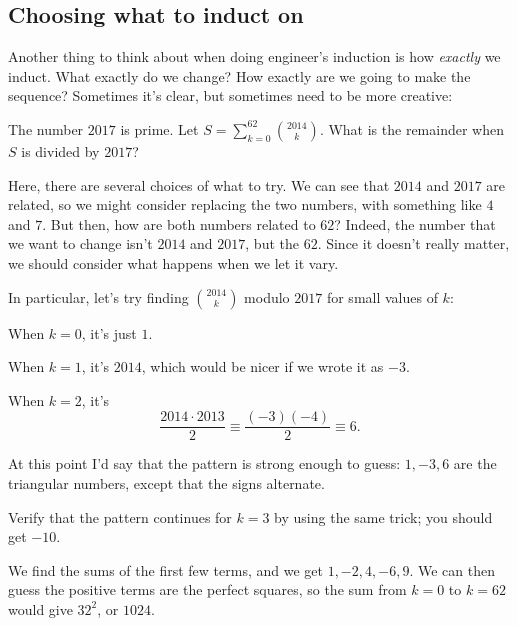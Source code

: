 \documentclass[11pt,paper=letter]{scrartcl}
\begin{document}
\subsection{Choosing what to induct on}

Another thing to think about when doing engineer's induction is how \textit{exactly} we induct. What exactly do we change? How exactly are we going to make the sequence? Sometimes it's clear, but sometimes need to be more creative:

\begin{exboxed}[AMC 12B 2014/23]
  The number $2017$ is prime. Let $\displaystyle S=\sum_{k=0}^{62}\binom{2014}{k}$. What is the remainder when $S$ is divided by $2017$?
\end{exboxed}

Here, there are several choices of what to try. We can see that $2014$ and $2017$ are related, so we might consider replacing the two numbers, with something like $4$ and $7$. But then, how are both numbers related to $62$? Indeed, the number that we want to change isn't $2014$ and $2017$, but the $62$. Since it doesn't really matter, we should consider what happens when we let it vary.

In particular, let's try finding $\binom{2014}{k}$ modulo $2017$ for small values of $k$:
\begin{itemthin}
  \item When $k = 0$, it's just $1$.
  \item When $k = 1$, it's $2014$, which would be nicer if we wrote it as $-3$.
  \item When $k = 2$, it's
  \[
  \frac{2014 \cdot 2013}{2} \equiv \frac{(-3)(-4)}{2} \equiv 6.
  \]
\end{itemthin}
At this point I'd say that the pattern is strong enough to guess: $1, -3, 6$ are the triangular numbers, except that the signs alternate.
\begin{exrboxed}
  Verify that the pattern continues for $k = 3$ by using the same trick; you should get $-10$.
\end{exrboxed}
We find the sums of the first few terms, and we get $1, -2, 4, -6, 9$. We can then guess the positive terms are the perfect squares, so the sum from $k = 0$ to $k = 62$ would give $32^2$, or $1024$.
\end{document}
